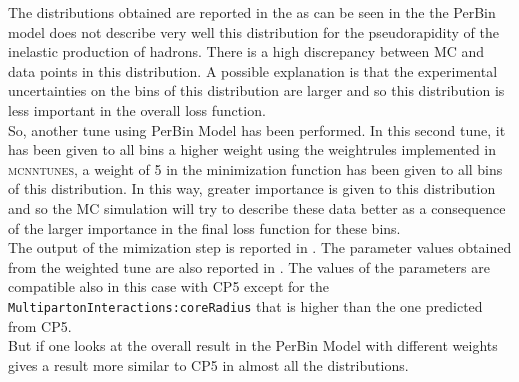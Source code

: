 The distributions obtained are reported in the  as can be seen in the  the PerBin model does not describe very well this distribution for the pseudorapidity of the inelastic production of hadrons. There is a high discrepancy between MC and data points in this distribution. A possible explanation is that the experimental uncertainties on the bins of this distribution are larger and so this distribution is less important in the overall loss function.
\\
So, another tune using PerBin Model has been performed. In this  second tune, it has been given to all  bins a higher weight using the weightrules implemented in \textsc{mcnntunes}, a weight of 5 in the minimization function has been given to all bins of this distribution. In this way, greater importance is given to this distribution and so the MC simulation will try to describe these data better as a consequence of the larger importance in the final loss function for these bins.
\\
The output of the mimization step is reported in . 
The parameter values obtained from the weighted tune are also reported in . The values of the parameters are compatible also in this case with CP5 except for the \mbox{\texttt{MultipartonInteractions:coreRadius}} that is higher than the one predicted from CP5.
\\
But if one looks at the overall result in 
the PerBin Model with different weights gives a result more similar to CP5 in almost all the distributions. 


